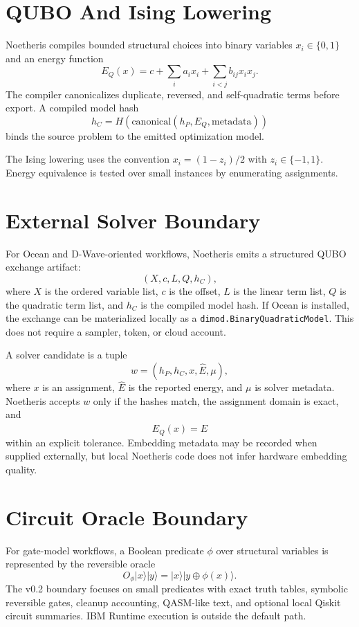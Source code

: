 \documentclass[11pt]{article}
\begin{document}
\section{QUBO And Ising Lowering}

Noetheris compiles bounded structural choices into binary variables
$x_i \in \{0,1\}$ and an energy function
\[
  E_Q(x) = c + \sum_i a_i x_i + \sum_{i<j} b_{ij} x_i x_j.
\]
The compiler canonicalizes duplicate, reversed, and self-quadratic terms before
export. A compiled model hash
\[
  h_C = H(\mathrm{canonical}(h_P, E_Q, \mathrm{metadata}))
\]
binds the source problem to the emitted optimization model.

The Ising lowering uses the convention $x_i = (1 - z_i)/2$ with
$z_i \in \{-1,1\}$. Energy equivalence is tested over small instances by
enumerating assignments.

\section{External Solver Boundary}

For Ocean and D-Wave-oriented workflows, Noetheris emits a structured QUBO
exchange artifact:
\[
  (X, c, L, Q, h_C),
\]
where $X$ is the ordered variable list, $c$ is the offset, $L$ is the linear
term list, $Q$ is the quadratic term list, and $h_C$ is the compiled model
hash. If Ocean is installed, the exchange can be materialized locally as a
\texttt{dimod.BinaryQuadraticModel}. This does not require a sampler, token, or
cloud account.

A solver candidate is a tuple
\[
  w = (h_P, h_C, x, \hat{E}, \mu),
\]
where $x$ is an assignment, $\hat{E}$ is the reported energy, and $\mu$ is
solver metadata. Noetheris accepts $w$ only if the hashes match, the assignment
domain is exact, and
\[
  E_Q(x) = \hat{E}
\]
within an explicit tolerance. Embedding metadata may be recorded when supplied
externally, but local Noetheris code does not infer hardware embedding quality.

\section{Circuit Oracle Boundary}

For gate-model workflows, a Boolean predicate $\phi$ over structural variables
is represented by the reversible oracle
\[
  O_\phi |x\rangle |y\rangle = |x\rangle |y \oplus \phi(x)\rangle.
\]
The v0.2 boundary focuses on small predicates with exact truth tables,
symbolic reversible gates, cleanup accounting, QASM-like text, and optional
local Qiskit circuit summaries. IBM Runtime execution is outside the default
path.
\end{document}
